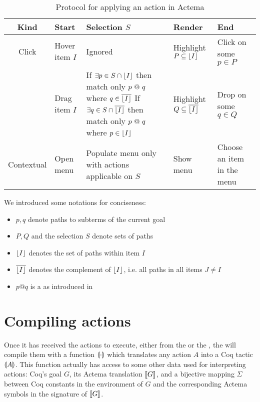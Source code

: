 \begin{table*}[]
  \def\arraystretch{1.5}
  \begin{tabular}{|c|C{0.2\textwidth}|C{0.4\textwidth}|C{0.25\textwidth}|C{0.2\textwidth}|}
  \hline
  \textbf{Kind} & \textbf{Start}       & \textbf{Selection $S$} &
  \textbf{Render}                      & \textbf{End} \\ \hline
  Click         & Hover item $I$       & Ignored & Highlight $P \subseteq
  \lfloor I \rfloor$ & Click on some $p \in P$    \\ \hline
             & Drag item $I$        &
      If $\exists p \in S \cap \lfloor I \rfloor$ then match only $p \operatorname{\,@\,} q$ where
      $q \in \overline{\lfloor I \rfloor}$
      \newline
      If $\exists q \in S \cap \overline{\lfloor I \rfloor}$ then match only $p
      \operatorname{\,@\,} q$ where $p \in \lfloor I \rfloor$
    & Highlight $Q \subseteq \overline{\lfloor I \rfloor}$ & Drop on some $q \in Q$ \\ \hline
  Contextual    & Open menu & Populate menu only with actions
  applicable on $S$ & Show menu & Choose an item in the menu \\ \hline
  \end{tabular}
  \raggedright
  \parbox{\textwidth}{
    \vspace{1.5em}
    We introduced some notations for conciseness:
    \begin{itemize}
      \item $p, q$ denote paths to subterms of the current goal
      \item $P, Q$ and the selection $S$ denote sets of paths
      \item $\lfloor I \rfloor$ denotes the set of paths within item $I$
      \item $\overline{\lfloor I \rfloor}$ denotes the complement of $\lfloor I \rfloor$, i.e.
      all paths in all items $J \not= I$
      \item $p @ q$ is a  as introduced in 
    \end{itemize}}

  \caption{Protocol for applying an action in Actema}
\end{table*}


\section{Compiling actions}

Once it has received the actions to execute, either from the 
or the , the  will compile them with a function
$\llparenthesis \cdot \rrparenthesis$ which translates any action $A$ into a Coq tactic
$\llparenthesis A \rrparenthesis$. This function actually has access to some other data used for
interpreting actions: Coq's goal $G$, its Actema translation $\llbracket G \rrbracket$, and a
bijective mapping $\Sigma$ between Coq constants in the environment of $G$ and
the corresponding Actema symbols in the  signature of $\llbracket G \rrbracket$.

